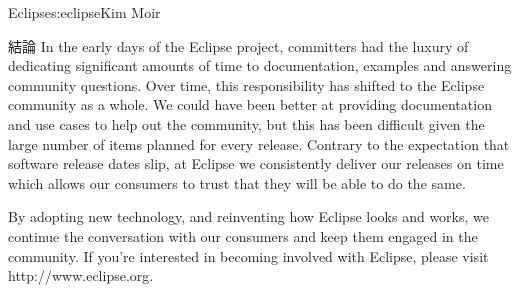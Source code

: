 \begin{aosachapter}{Eclipse}{s:eclipse}{Kim Moir}
\begin{aosasect1}{結論}
In the early days of the Eclipse project, committers had the luxury of
dedicating significant amounts of time to documentation, examples and
answering community questions. Over time, this responsibility has
shifted to the Eclipse community as a whole.  We could have been
better at providing documentation and use cases to help out the
community, but this has been difficult given the large number of items
planned for every release.  Contrary to the expectation that software
release dates slip, at Eclipse we consistently deliver our releases on
time which allows our consumers to trust that they will be able to do
the same.

By adopting new technology, and reinventing how Eclipse looks and
works, we continue the conversation with our consumers and keep
them engaged in the community. If you're interested in becoming
involved with Eclipse, please visit http://www.eclipse.org.
\end{aosasect1}

\end{aosachapter}
